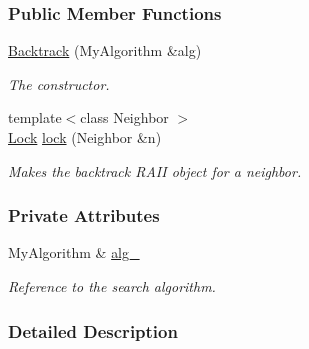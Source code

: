 \subsubsection*{Public Member Functions}
\begin{DoxyCompactItemize}
\item 
\hyperlink{structslb_1_1core_1_1sb_1_1Backtrack_af524ba379b3f7a121d8a4e1bda44a171}{Backtrack} (My\+Algorithm \&alg)\hypertarget{structslb_1_1core_1_1sb_1_1Backtrack_af524ba379b3f7a121d8a4e1bda44a171}{}\label{structslb_1_1core_1_1sb_1_1Backtrack_af524ba379b3f7a121d8a4e1bda44a171}

\begin{DoxyCompactList}\small\item\em The constructor. \end{DoxyCompactList}\item 
{\footnotesize template$<$class Neighbor $>$ }\\\hyperlink{structslb_1_1core_1_1sb_1_1Backtrack_abdf145f8f0475d4f557024f6981b0668}{Lock} \hyperlink{structslb_1_1core_1_1sb_1_1Backtrack_a6de9dc24d4e8749ea422fd0442d47199}{lock} (Neighbor \&n)
\begin{DoxyCompactList}\small\item\em Makes the backtrack R\+A\+II object for a neighbor. \end{DoxyCompactList}\end{DoxyCompactItemize}
\subsubsection*{Private Attributes}
\begin{DoxyCompactItemize}
\item 
My\+Algorithm \& \hyperlink{structslb_1_1core_1_1sb_1_1Backtrack_ab5ca08806d5c1f82202d2e74871cc99a}{alg\+\_\+}\hypertarget{structslb_1_1core_1_1sb_1_1Backtrack_ab5ca08806d5c1f82202d2e74871cc99a}{}\label{structslb_1_1core_1_1sb_1_1Backtrack_ab5ca08806d5c1f82202d2e74871cc99a}

\begin{DoxyCompactList}\small\item\em Reference to the search algorithm. \end{DoxyCompactList}\end{DoxyCompactItemize}


\subsubsection{Detailed Description}

